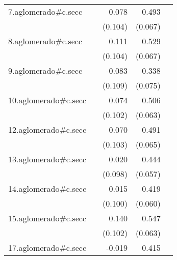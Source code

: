 {\begin{longtable}{l*{4}{D{.}{.}{-1}}}
\addlinespace
7.aglomerado#c.secc&                     &       0.078         &       0.493\sym{***}&                     \\
            &                     &     (0.104)         &     (0.067)         &                     \\
\addlinespace
8.aglomerado#c.secc&                     &       0.111         &       0.529\sym{***}&                     \\
            &                     &     (0.104)         &     (0.067)         &                     \\
\addlinespace
9.aglomerado#c.secc&                     &      -0.083         &       0.338\sym{***}&                     \\
            &                     &     (0.109)         &     (0.075)         &                     \\
\addlinespace
10.aglomerado#c.secc&                     &       0.074         &       0.506\sym{***}&                     \\
            &                     &     (0.102)         &     (0.063)         &                     \\
\addlinespace
12.aglomerado#c.secc&                     &       0.070         &       0.491\sym{***}&                     \\
            &                     &     (0.103)         &     (0.065)         &                     \\
\addlinespace
13.aglomerado#c.secc&                     &       0.020         &       0.444\sym{***}&                     \\
            &                     &     (0.098)         &     (0.057)         &                     \\
\addlinespace
14.aglomerado#c.secc&                     &       0.015         &       0.419\sym{***}&                     \\
            &                     &     (0.100)         &     (0.060)         &                     \\
\addlinespace
15.aglomerado#c.secc&                     &       0.140         &       0.547\sym{***}&                     \\
            &                     &     (0.102)         &     (0.063)         &                     \\
\addlinespace
17.aglomerado#c.secc&                     &      -0.019         &       0.415\sym{***}&                     \\

\end{longtable}}
